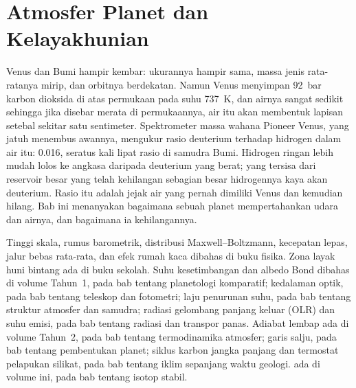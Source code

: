 \chapter{Atmosfer Planet dan Kelayakhunian}\label{ch:b3:planetary-atmospheres}

Venus dan Bumi hampir kembar: ukurannya hampir sama, massa jenis rata-ratanya
mirip, dan orbitnya berdekatan. Namun Venus menyimpan \qty{92}{bar} karbon
dioksida di atas permukaan pada suhu \qty{737}{K}, dan airnya sangat sedikit sehingga jika disebar
merata di permukaannya, air itu akan membentuk lapisan setebal sekitar satu sentimeter. Spektrometer massa
wahana Pioneer Venus, yang jatuh menembus awannya,
mengukur rasio deuterium terhadap hidrogen dalam air itu: \num{0.016},
seratus kali lipat rasio di samudra Bumi. Hidrogen ringan lebih mudah lolos
ke angkasa daripada deuterium yang berat; yang tersisa dari reservoir besar
yang telah kehilangan sebagian besar hidrogennya kaya akan deuterium. Rasio itu
adalah jejak air yang pernah dimiliki Venus dan kemudian hilang. Bab ini menanyakan
bagaimana sebuah planet mempertahankan udara dan airnya, dan bagaimana ia kehilangannya.

\begin{recall}
Tinggi skala, rumus barometrik, distribusi Maxwell--Boltzmann,
kecepatan lepas, jalur bebas rata-rata, dan efek rumah kaca
dibahas di buku fisika. Zona layak huni bintang ada di
buku sekolah. Suhu kesetimbangan dan albedo Bond dibahas di
volume Tahun~1, pada bab tentang planetologi komparatif; kedalaman
optik, pada bab tentang teleskop dan fotometri; laju penurunan suhu, pada
bab tentang struktur atmosfer dan samudra; radiasi gelombang panjang
keluar (OLR) dan suhu emisi, pada bab tentang
radiasi dan transpor panas. Adiabat lembap ada di volume Tahun~2,
pada bab tentang termodinamika atmosfer; garis salju, pada
bab tentang pembentukan planet; siklus karbon jangka panjang dan
termostat pelapukan silikat, pada bab tentang iklim sepanjang
waktu geologi.  ada di volume ini, pada bab tentang isotop
stabil.
\end{recall}

